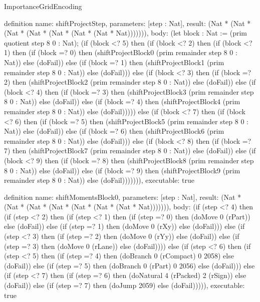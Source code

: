 \begin{lexlean}{ImportanceGridEncoding}
\begin{semanticmodule}
definition{
  name: shiftProjectStep,
  parameters: [step : Nat],
  result: (Nat * (Nat * (Nat * (Nat * (Nat * (Nat * (Nat * Nat))))))),
  body: (let block : Nat := (prim quotient step 8 0 : Nat); (if (block <? 5) then
      (if (block <? 2) then
      (if (block <? 1) then
      (if (block =? 0) then (shiftProjectBlock0 (prim remainder step 8 0 : Nat)) else (doFail)) else
      (if (block =? 1) then (shiftProjectBlock1 (prim remainder step 8 0 : Nat)) else (doFail))) else
      (if (block <? 3) then
      (if (block =? 2) then (shiftProjectBlock2 (prim remainder step 8 0 : Nat)) else (doFail)) else
      (if (block <? 4) then
      (if (block =? 3) then (shiftProjectBlock3 (prim remainder step 8 0 : Nat)) else (doFail)) else
      (if (block =? 4) then (shiftProjectBlock4 (prim remainder step 8 0 : Nat)) else (doFail))))) else
      (if (block <? 7) then
      (if (block <? 6) then
      (if (block =? 5) then (shiftProjectBlock5 (prim remainder step 8 0 : Nat)) else (doFail)) else
      (if (block =? 6) then (shiftProjectBlock6 (prim remainder step 8 0 : Nat)) else (doFail))) else
      (if (block <? 8) then
      (if (block =? 7) then (shiftProjectBlock7 (prim remainder step 8 0 : Nat)) else (doFail)) else
      (if (block <? 9) then
      (if (block =? 8) then (shiftProjectBlock8 (prim remainder step 8 0 : Nat)) else (doFail)) else
      (if (block =? 9) then (shiftProjectBlock9 (prim remainder step 8 0 : Nat)) else (doFail))))))),
  executable: true
}

definition{
  name: shiftMomentsBlock0,
  parameters: [step : Nat],
  result: (Nat * (Nat * (Nat * (Nat * (Nat * (Nat * (Nat * Nat))))))),
  body: (if (step <? 4) then
      (if (step <? 2) then
      (if (step <? 1) then
      (if (step =? 0) then (doMove 0 (rPart)) else (doFail)) else
      (if (step =? 1) then (doMove 0 (rXy)) else (doFail))) else
      (if (step <? 3) then
      (if (step =? 2) then (doMove 0 (rYy)) else (doFail)) else
      (if (step =? 3) then (doMove 0 (rLane)) else (doFail)))) else
      (if (step <? 6) then
      (if (step <? 5) then
      (if (step =? 4) then (doBranch 0 (rCompact) 0 2058) else (doFail)) else
      (if (step =? 5) then (doBranch 0 (rPart) 0 2056) else (doFail))) else
      (if (step <? 7) then
      (if (step =? 6) then (doNatural 4 (rPacked) 2 (rSign)) else (doFail)) else
      (if (step =? 7) then (doJump 2059) else (doFail))))),
  executable: true
}


\end{semanticmodule}
\end{lexlean}
